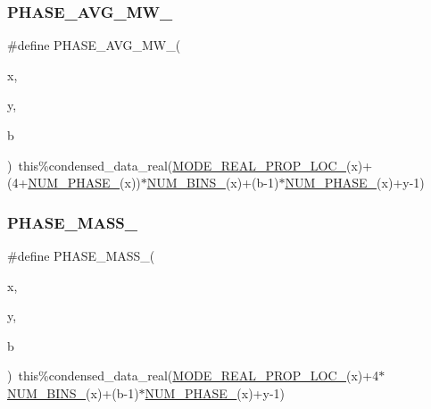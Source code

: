 \subsubsection{\texorpdfstring{P\+H\+A\+S\+E\+\_\+\+A\+V\+G\+\_\+\+M\+W\+\_\+}{PHASE\_AVG\_MW\_}}
{\footnotesize\ttfamily \#define P\+H\+A\+S\+E\+\_\+\+A\+V\+G\+\_\+\+M\+W\+\_\+(\begin{DoxyParamCaption}\item[{}]{x,  }\item[{}]{y,  }\item[{}]{b }\end{DoxyParamCaption})~this\%condensed\+\_\+data\+\_\+real(\mbox{\hyperlink{aero__rep__modal__binned__mass_8_f90_ab695417de3b45908793bd92ca251cf91}{M\+O\+D\+E\+\_\+\+R\+E\+A\+L\+\_\+\+P\+R\+O\+P\+\_\+\+L\+O\+C\+\_\+}}(x)+(4+\mbox{\hyperlink{aero__rep__single__particle_8_f90_aff1191174604af4c86c622f98cd18c17}{N\+U\+M\+\_\+\+P\+H\+A\+S\+E\+\_\+}}(x))$\ast$\mbox{\hyperlink{aero__rep__modal__binned__mass_8_f90_ae54530817d65033793af17ccdea393fc}{N\+U\+M\+\_\+\+B\+I\+N\+S\+\_\+}}(x)+(b-\/1)$\ast$\mbox{\hyperlink{aero__rep__single__particle_8_f90_aff1191174604af4c86c622f98cd18c17}{N\+U\+M\+\_\+\+P\+H\+A\+S\+E\+\_\+}}(x)+y-\/1)}

\mbox{\label{aero__rep__modal__binned__mass_8_f90_aed11d52678d2b6369215eea0a0533a84}} 
\subsubsection{\texorpdfstring{P\+H\+A\+S\+E\+\_\+\+M\+A\+S\+S\+\_\+}{PHASE\_MASS\_}}
{\footnotesize\ttfamily \#define P\+H\+A\+S\+E\+\_\+\+M\+A\+S\+S\+\_\+(\begin{DoxyParamCaption}\item[{}]{x,  }\item[{}]{y,  }\item[{}]{b }\end{DoxyParamCaption})~this\%condensed\+\_\+data\+\_\+real(\mbox{\hyperlink{aero__rep__modal__binned__mass_8_f90_ab695417de3b45908793bd92ca251cf91}{M\+O\+D\+E\+\_\+\+R\+E\+A\+L\+\_\+\+P\+R\+O\+P\+\_\+\+L\+O\+C\+\_\+}}(x)+4$\ast$\mbox{\hyperlink{aero__rep__modal__binned__mass_8_f90_ae54530817d65033793af17ccdea393fc}{N\+U\+M\+\_\+\+B\+I\+N\+S\+\_\+}}(x)+(b-\/1)$\ast$\mbox{\hyperlink{aero__rep__single__particle_8_f90_aff1191174604af4c86c622f98cd18c17}{N\+U\+M\+\_\+\+P\+H\+A\+S\+E\+\_\+}}(x)+y-\/1)}

